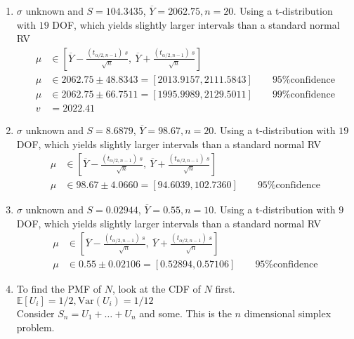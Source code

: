 \begin{enumerate}
	
	\item $ \sigma $ unknown and $ S = 104.3435 $, $ \overline{Y} = 2062.75, n = 20$. Using a t-distribution with $ 19 $ DOF, which yields slightly larger intervals than a standard normal RV\\
	
		\begin{align}
			\mu &\in \left[ \overline{Y} - \frac{(t_{\alpha/2, n-1})\ s}{\sqrt{n}}, \ \overline{Y} + \frac{(t_{\alpha/2, n-1})\ s}{\sqrt{n}} \right] \nonumber \\
			\mu &\in 2062.75 \pm 48.8343 = [2013.9157, 2111.5843] \qquad \text{95\% confidence} \nonumber \\
			\mu &\in 2062.75 \pm 66.7511 = [1995.9989, 2129.5011] \qquad \text{99\% confidence} \nonumber \\
			v &= 2022.41
		\end{align}
	
	
	\item $ \sigma $ unknown and $ S = 8.6879 $, $ \overline{Y} = 98.67, n = 20$. Using a t-distribution with $ 19 $ DOF, which yields slightly larger intervals than a standard normal RV\\
	
		\begin{align}
			\mu &\in \left[ \overline{Y} - \frac{(t_{\alpha/2, n-1})\ s}{\sqrt{n}}, \ \overline{Y} + \frac{(t_{\alpha/2, n-1})\ s}{\sqrt{n}} \right] \nonumber \\
			\mu &\in 98.67 \pm 4.0660 = [94.6039, 102.7360] \qquad \text{95\% confidence} 
		\end{align}
	
	
	\item $ \sigma $ unknown and $ S = 0.02944 $, $ \overline{Y} = 0.55, n = 10$. Using a t-distribution with $ 9 $ DOF, which yields slightly larger intervals than a standard normal RV\\
	
		\begin{align}
			\mu &\in \left[ \overline{Y} - \frac{(t_{\alpha/2, n-1})\ s}{\sqrt{n}}, \ \overline{Y} + \frac{(t_{\alpha/2, n-1})\ s}{\sqrt{n}} \right] \nonumber \\
			\mu &\in 0.55 \pm 0.02106 = [0.52894, 0.57106] \qquad \text{95\% confidence} 
		\end{align}
	
	
	\item 
		To find the PMF of $ N $, look at the CDF of $ N $ first. $ \mathbb{E}[U_i] = 1/2, \mathrm{Var}(U_i) = 1/12 $\\
		Consider $ S_n = U_1 + \dots + U_n $ and some. This is the $ n $ dimensional simplex problem.
		

\end{enumerate}
